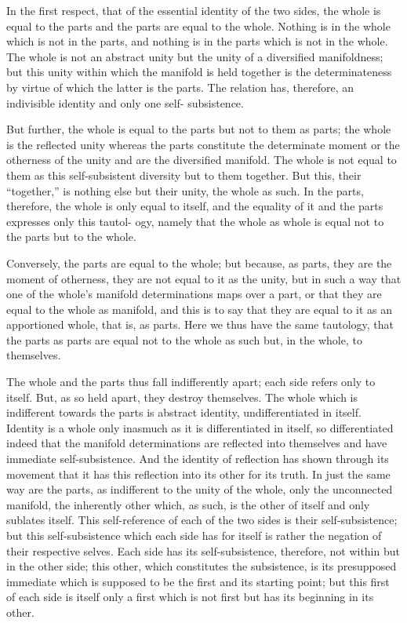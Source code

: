 In the first respect, that of the essential identity of the two sides, the
whole is equal to the parts and the parts are equal to the whole. Nothing is
in the whole which is not in the parts, and nothing is in the parts which
is not in the whole. The whole is not an abstract unity but the unity
of a diversified manifoldness; but this unity within which the manifold is
held together is the determinateness by virtue of which the latter is the
parts. The relation has, therefore, an indivisible identity and only one self-
subsistence.

But further, the whole is equal to the parts but not to them as parts; the
whole is the reflected unity whereas the parts constitute the determinate
moment or the otherness of the unity and are the diversified manifold.
The whole is not equal to them as this self-subsistent diversity but to
them together. But this, their “together,” is nothing else but their unity,
the whole as such. In the parts, therefore, the whole is only equal to
itself, and the equality of it and the parts expresses only this tautol-
ogy, namely that the whole as whole is equal not to the parts but to the
whole.

Conversely, the parts are equal to the whole; but because, as parts, they
are the moment of otherness, they are not equal to it as the unity, but in
such a way that one of the whole's manifold determinations maps over a
part, or that they are equal to the whole as manifold, and this is to say that
they are equal to it as an apportioned whole, that is, as parts. Here we thus
have the same tautology, that the parts as parts are equal not to the whole as
such but, in the whole, to themselves.

The whole and the parts thus fall indifferently apart; each side refers
only to itself. But, as so held apart, they destroy themselves. The whole
which is indifferent towards the parts is abstract identity, undifferentiated
in itself. Identity is a whole only inasmuch as it is differentiated in itself,
so differentiated indeed that the manifold determinations are reflected
into themselves and have immediate self-subsistence. And the identity of
reflection has shown through its movement that it has this reflection into
its other for its truth.
In just the same way are the parts, as indifferent
to the unity of the whole, only the unconnected manifold, the inherently
other which, as such, is the other of itself and only sublates itself.
This self-reference of each of the two sides is their self-subsistence; but this
self-subsistence which each side has for itself is rather the negation of their
respective selves. Each side has its self-subsistence, therefore, not within
but in the other side; this other, which constitutes the subsistence, is its
presupposed immediate which is supposed to be the first and its starting
point; but this first of each side is itself only a first which is not first but
has its beginning in its other.


